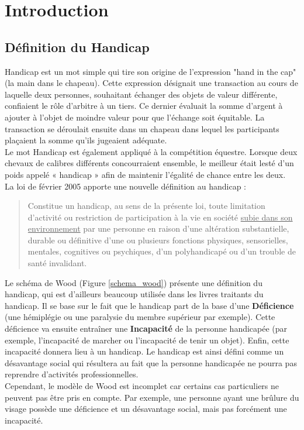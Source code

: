 \chapter{Introduction}

\section{Définition du Handicap}
Handicap est un mot simple qui tire son origine de l'expression "hand in the cap" (la main dans le chapeau). Cette expression désignait une transaction au cours de laquelle deux personnes, souhaitant échanger des objets de valeur différente, confiaient le r\^ole d'arbitre à un tiers. Ce dernier évaluait la somme d'argent à ajouter à l'objet de moindre valeur pour que l'échange soit équitable. La transaction se déroulait ensuite dans un chapeau dans lequel les participants plaçaient la somme qu'ils jugeaient adéquate.\\

Le mot Handicap est également appliqué à la compétition équestre. Lorsque deux chevaux de calibres différents concourraient ensemble, le meilleur était lesté d’un poids appelé « handicap » afin de maintenir l’égalité de chance entre les deux.\\

\noindent La loi de février 2005 apporte une nouvelle définition au handicap :

\begin{quotation}
\noindent Constitue un handicap, au sens de la présente loi, toute limitation d’activité ou restriction de participation à la vie en société \underline{subie dans son environnement} par une personne en raison d’une altération substantielle, durable ou définitive d’une ou plusieurs fonctions physiques, sensorielles, mentales, cognitives ou psychiques, d’un polyhandicapé ou d’un trouble de santé invalidant.\\
\end{quotation}


Le schéma de Wood (Figure \ref{schema_wood}) présente une définition du handicap, qui est d'ailleurs beaucoup utilisée dans les livres traitants du handicap. Il se base sur le fait que le handicap part de la base d'une \textbf{Déficience} (une hémiplégie ou une paralysie du membre supérieur par exemple). Cette déficience va ensuite entraîner une \textbf{Incapacité} de la personne handicapée (par exemple, l'incapacité de marcher ou l'incapacité de tenir un objet). Enfin, cette incapacité donnera lieu à un handicap. Le handicap est ainsi défini comme un désavantage social qui résultera au fait que la personne handicapée ne pourra pas reprendre d'activités professionnelles.\\
Cependant, le modèle de Wood est incomplet car certains cas particuliers ne peuvent pas être pris en compte. Par exemple, une personne ayant une brûlure du visage possède une déficience et un désavantage social, mais pas forcément une incapacité.\\

